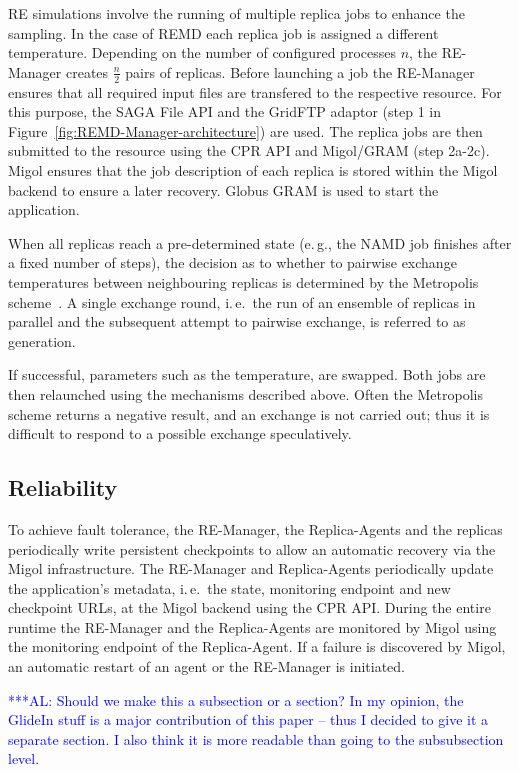 \documentclass{rspublic}
\newcommand{\alnote}[1]{ {\textcolor{blue} { ***AL: #1 }}}
\newcommand{\alnote}[1]{}
\newcommand{\remanager}[1]{RE-Manager }
\begin{document}
RE simulations involve the running of multiple replica jobs to enhance the sampling. 
In the case of REMD each replica job is assigned a different temperature.  
Depending on the number of configured processes $n$, the \remanager\
creates $\frac{n}{2}$ pairs of replicas.
Before launching a job the \remanager\ ensures that all required input 
files are transfered to the respective resource. For this purpose, the SAGA File API and the
GridFTP adaptor (step 1 in Figure~\ref{fig:REMD-Manager-architecture})
are used.  The replica jobs are then submitted to the resource
using the CPR API and Migol/GRAM (step 2a-2c). Migol ensures that the
job description of each replica is stored within the Migol backend
to ensure a later recovery. Globus GRAM is used to start the
application.

When all replicas reach a pre-determined state (e.\,g., the NAMD job finishes 
after a fixed number of steps), the decision as to whether to pairwise 
exchange temperatures between neighbouring replicas
is determined by the Metropolis scheme~\citep{metropolis:1087}.    
A single exchange round, i.\,e.\ the run of an ensemble of
replicas in parallel and the subsequent attempt to pairwise
exchange, is referred to as generation.                                                         

If successful, parameters such as the temperature, are swapped. Both jobs are then
relaunched using the mechanisms described above. Often the Metropolis
scheme returns a negative result, and an exchange is not carried out;
thus it is difficult to respond to a possible exchange speculatively. 

\subsection{Reliability}
To achieve fault tolerance, the RE-Manager, the Replica-Agents and the
replicas periodically write persistent checkpoints to allow
an automatic recovery via the Migol infrastructure. The \remanager\
and Replica-Agents periodically update the application's metadata,
i.\,e.\ the state, monitoring endpoint and new checkpoint URLs, at the
Migol backend using the CPR API. During the entire runtime the
\remanager\ and the Replica-Agents are monitored by Migol using the
monitoring endpoint of the Replica-Agent. If a failure is discovered
by Migol, an automatic restart of an agent or the RE-Manager is
initiated.

\alnote{Should we make this a subsection or a section? In my opinion,
the GlideIn stuff is a major contribution of this paper -- thus I decided to
give it a separate section. I also think it is more readable than going to the
subsubsection level.}           
\end{document}
